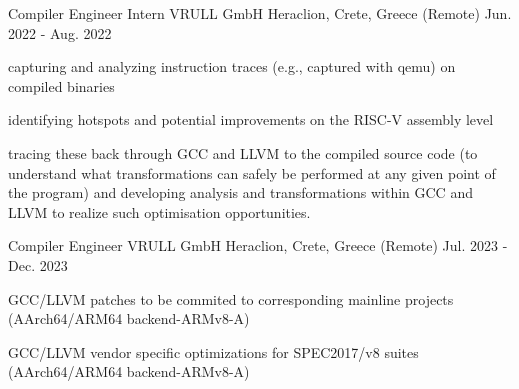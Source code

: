 
\begin{cventries}

  \cventry
    {Compiler Engineer Intern} %
    {VRULL GmbH} %
    {Heraclion, Crete, Greece (Remote)} %
    {Jun. 2022 - Aug. 2022} %
    {
      \begin{cvitems} %
        \item {capturing and analyzing instruction traces (e.g., captured with qemu) on compiled binaries}
	\item {identifying hotspots and potential improvements on the RISC-V assembly level}
	\item {tracing these back through GCC and LLVM to the compiled source code (to understand what
transformations can safely be performed at any given point of the program) and developing
analysis and transformations within GCC and LLVM to realize such optimisation opportunities.}
      \end{cvitems}
    }



  \cventry
    {Compiler Engineer} %
    {VRULL GmbH} %
    {Heraclion, Crete, Greece (Remote)} %
    {Jul. 2023 - Dec. 2023} %
    {
      \begin{cvitems} %
        \item {GCC/LLVM patches to be commited to corresponding mainline projects (AArch64/ARM64 backend-ARMv8-A)}
		\item {GCC/LLVM vendor specific optimizations for SPEC2017/v8 suites (AArch64/ARM64 backend-ARMv8-A)}
      \end{cvitems}
    }
\end{cventries}
